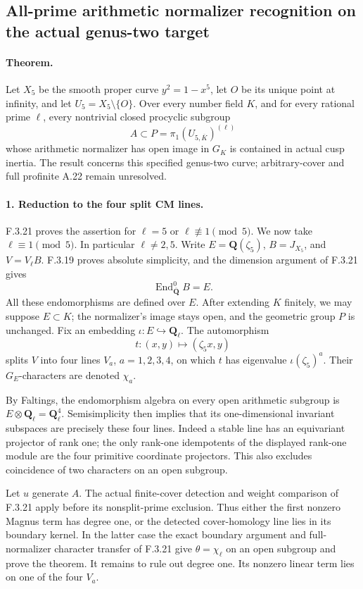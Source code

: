 \subsection*{All-prime arithmetic normalizer recognition on the actual genus-two target}

\paragraph{Theorem.}
Let $X_5$ be the smooth proper curve $y^2=1-x^5$, let $O$ be its
unique point at infinity, and let $U_5=X_5\setminus\{O\}$.
Over every number field $K$, and for every rational prime $\ell$,
every nontrivial closed procyclic subgroup
\[
 A\subset P=\pi_1(U_{5,\overline K})^{(\ell)}
\]
whose arithmetic normalizer has open image in $G_K$ is contained
in actual cusp inertia. The result concerns this specified
genus-two curve; arbitrary-cover and full profinite A.22 remain
unresolved.

\paragraph{1. Reduction to the four split CM lines.}
F.3.21 proves the assertion for $\ell=5$ or
$\ell\not\equiv1\pmod5$. We now take $\ell\equiv1\pmod5$.
In particular $\ell\ne2,5$. Write $E=\mathbf Q(\zeta_5)$,
$B=J_{X_5}$, and $V=V_\ell B$. F.3.19 proves absolute
simplicity, and the dimension argument of F.3.21 gives
\[
 \operatorname{End}^0_{\overline{\mathbf Q}}B=E.
\]
All these endomorphisms are defined over $E$. After extending
$K$ finitely, we may suppose $E\subset K$; the normalizer's
image stays open, and the geometric group $P$ is unchanged.
Fix an embedding $\iota:E\hookrightarrow\mathbf Q_\ell$.
The automorphism
\[
 t:(x,y)\longmapsto(\zeta_5x,y)
\]
splits $V$ into four lines $V_a$, $a=1,2,3,4$, on which $t$
has eigenvalue $\iota(\zeta_5)^a$. Their $G_E$-characters are
denoted $\chi_a$.

By Faltings, the endomorphism algebra on every open arithmetic
subgroup is $E\otimes\mathbf Q_\ell=\mathbf Q_\ell^4$.
Semisimplicity then implies that its one-dimensional invariant
subspaces are precisely these four lines. Indeed a stable
line has an equivariant projector of rank one; the only
rank-one idempotents of the displayed rank-one module are
the four primitive coordinate projectors. This also excludes
coincidence of two characters on an open subgroup.

Let $u$ generate $A$. The actual finite-cover detection and
weight comparison of F.3.21 apply before its nonsplit-prime
exclusion. Thus either the first nonzero Magnus term has
degree one, or the detected cover-homology line lies in its
boundary kernel. In the latter case the exact boundary
argument and full-normalizer character transfer of F.3.21
give $\theta=\chi_\ell$ on an open subgroup and prove the
theorem. It remains to rule out degree one. Its nonzero
linear term lies on one of the four $V_a$.

